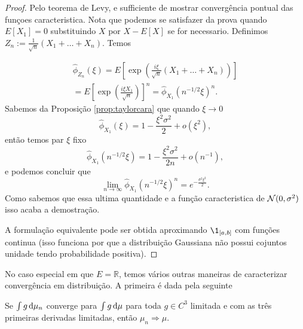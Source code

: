 \begin{proof}
 Pelo teorema de Levy, e sufficiente de mostrar convergência pontual das funçoes caracteristica.
 Nota que podemos se satisfazer da prova quando $E[X_1]=0$ substituindo $X$ por $X-E[X]$ se for necessario.
 Definimos $Z_n:= \frac{1}{\sqrt{n}}\left(X_1+\dots+X_n\right).$
 Temos

 \begin{multline}
  \hat \phi_{Z_n}(\xi)=E\left[\exp\left( \frac{i\xi}{\sqrt{n}}\left(X_1+\dots+X_n\right) \right)  \right]\\=
  E\left[ \exp\left( \frac{i\xi X_1}{\sqrt{n}} \right) \right]^{n}=  \hat \phi_{X_1}(n^{-1/2}\xi)^n.
 \end{multline}
Sabemos da Proposição \ref{prop:taylorcara} que quando $\xi\to 0$
\begin{equation}
 \hat \phi_{X_1}(\xi)= 1-\frac{\xi^2\sigma^2}{2}+o(\xi^2),
\end{equation}
então temos par $\xi$ fixo
\begin{equation}
  \hat \phi_{X_1}(n^{-1/2}\xi)=1- \frac{\xi^2\sigma^2}{2n}+o(n^{-1}),
\end{equation}
e podemos concluir que
\begin{equation}
 \lim_{n\to \infty} \hat \phi_{X_1}(n^{-1/2}\xi)^n= e^{-\frac{\sigma^2\xi^2}{2}}.
\end{equation}
Como sabemos que essa ultima quantidade e a função caracteristica de ${\mathcal N}(0,\sigma^2)$ isso acaba a demostração.

 \medskip

 A formulação equivalente pode ser obtida aproximando $\1_{[a,b]}$ com funções continua (isso funciona por que a distribuição Gaussiana não possui cojuntos unidade tendo probabilidade positiva).

\end{proof}





No caso especial em que $E = \mathbb{R}$, temos vários outras maneiras de caracterizar convergência em distribuição.
A primeira é dada pela seguinte

\begin{proposition}
  \label{p:conv_distr_suave}
  Se $\int g \mathop{}\!\mathrm{d} \mu_n$ converge para $\int g \mathop{}\!\mathrm{d} \mu$ para toda $g \in C^3$ limitada e com as três primeiras derivadas limitadas, então $\mu_n \Rightarrow \mu$.
\end{proposition}


